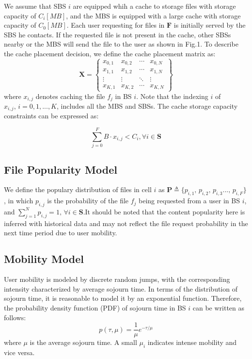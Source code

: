\documentclass[conference]{IEEEtran}
\begin{document}
We assume that SBS $i$ are equipped whih a cache to storage files with storage capacity of $C_i[MB]$, and the MBS is equipped with a large cache with storage capacity of
$C_0[MB]$. Each user requesting for files in $\mathbf{F}$ is initially served by the SBS he contacts. If the requested file is not present in the cache, other SBSs nearby or the MBS will send the file to the user as shown in Fig.1. To describe the cache placement decision, we define the cache placement matrix as:
$$\mathbf{X}=
\begin{Bmatrix}
x_{0,1}    &x_{0,2}  & \cdots & x_{0,N} \\
x_{1,1}    &x_{1,2}  & \cdots & x_{1,N} \\
\vdots    &\vdots  & \ddots &\vdots \\
x_{K,1}    &x_{K,2}  & \cdots & x_{K,N}
\end{Bmatrix}
$$
where $x_{i,j}$ denotes caching the file $f_j$ in BS $i$. Note that the indexing $i$ of $x_{i,j}\mathrm{,\,} i=0,1,...,K$, includes all the MBS and SBSs. The cache storage capacity constraints can be expressed as:

\begin{equation}
\sum_{j=0}^F B\cdot x_{i,j}<C_i,\forall{i}\in\mathbf{S}
\end{equation}

\subsection{File Popularity Model}
We define the populary distribution of files in cell $i$ as $\mathbf{P} \triangleq\{p_{i,1}\mathrm{,\,}p_{i,2}\mathrm{,\,}p_{i,3}...\mathrm{,\,}p_{i,F}\}$, in which $p_{i,j}$ is the probability of the file $f_j$ being requested from a user in BS $i$, and $ \sum_{j=1}^N p_{i,j}=1,\,\forall{i}\in\mathbf{S}$.It should be noted that the content popularity here is inferred with historical data and may not reflect the file request probability in the next time period due to user mobility.

\subsection{Mobility Model}
User mobility is modeled by discrete random jumps, with the corresponding intensity characterized by average sojourn time. In terms of the distribution of sojourn time, it is reasonable to model it by an exponential function\cite{8013789}. Therefore, the probability density function (PDF) of sojourn time in BS $i$ can be written as follows:
\begin{equation}
p(\tau,\mu)=\frac{1}{\mu}e^{-\tau/\mu}
\end{equation}
where $\mu$ is the average sojourn time. A small $\mu_i$ indicates intense mobility and vice versa.
\end{document}
